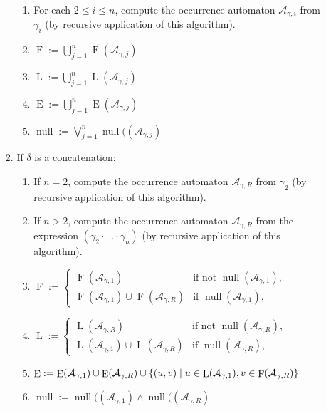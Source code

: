 \documentclass[a4paper,11pt, svgnames,titlepage]{article}
\newcommand{\rxc}{\cdot}
\newcommand{\df}{:=}
\DeclareMathOperator{\first}{F}
\DeclareMathOperator{\last}{L}
\DeclareMathOperator{\follow}{E}
\DeclareMathOperator{\nullable}{null}
\begin{document}
\begin{enumerate}
\begin{enumerate}[label*=\arabic*.]
\begin{enumerate}[label*=\arabic*.]
			\begin{enumerate}[label*=\arabic*.]
				\item For each $2\leq i\leq n$, compute the occurrence automaton $\mathcal{A}_{\gamma,i}$ from $\gamma_i$ (by recursive application of this algorithm).
				\item $\first\df \bigcup_{j=1}^{n} \first(\mathcal{A}_{\gamma,j})$
				\item $\last\df \bigcup_{j=1}^{n}\last(\mathcal{A}_{\gamma,j})$
				\item $\follow\df \bigcup_{j=1}^{n}\follow(\mathcal{A}_{\gamma,j})$
				\item $\nullable \df \bigvee_{j=1}^{n}\nullable((\mathcal{A}_{\gamma,j})$
			\end{enumerate}
			\item If $\delta$ is a concatenation:
			\begin{enumerate}[label*=\arabic*.]
				\item If $n=2$, compute the occurrence automaton $\mathcal{A}_{\gamma,R}$ from $\gamma_2$ (by recursive application of this algorithm).
				\item If $n>2$, compute the occurrence automaton $\mathcal{A}_{\gamma,R}$ from the expression $(\gamma_2\rxc\ldots\rxc\gamma_n)$ (by recursive application of this algorithm).
				\item $\first\df \begin{cases}
					\first(\mathcal{A}_{\gamma,1}) & \text{if not }\nullable(\mathcal{A}_{\gamma,1}),\\
					\first(\mathcal{A}_{\gamma,1})\cup\first(\mathcal{A}_{\gamma,R}) & \text{if }\nullable(\mathcal{A}_{\gamma,1}),
				\end{cases}$
				\item $\last\df \begin{cases}
					\last(\mathcal{A}_{\gamma,R}) & \text{if not }\nullable(\mathcal{A}_{\gamma,R}),\\
					\last(\mathcal{A}_{\gamma,1})\cup\last(\mathcal{A}_{\gamma,R}) & \text{if }\nullable(\mathcal{A}_{\gamma,R}),
				\end{cases}$
				\item 
					$\follow\df \follow(\mathcal{A}_{\gamma,1})\cup\follow(\mathcal{A}_{\gamma,R})\\
					\cup\{(u,v)\mid u\in\last(\mathcal{A}_{\gamma,1}), v\in\first(\mathcal{A}_{\gamma,R})\}$
				\item $\nullable \df \nullable((\mathcal{A}_{\gamma,1})\wedge\nullable((\mathcal{A}_{\gamma,R})$
			\end{enumerate}	
		\end{enumerate}
	\end{enumerate}
\end{enumerate}
\end{document}
